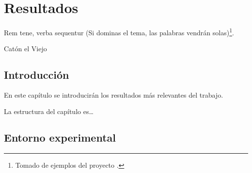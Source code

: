 %
%
%
% 
%
%
%
%

\chapter{Resultados}
\label{cha:resultados}


\begin{FraseCelebre}
  \begin{Frase}
    Rem tene, verba sequentur (Si dominas el tema, las palabras vendrán solas)\footnote{Tomado de ejemplos del proyecto \texis{}.}.
  \end{Frase}
  \begin{Fuente}
    Catón el Viejo
  \end{Fuente}
\end{FraseCelebre}

\section{Introducción}
\label{sec:introduccion-resultados}

En este capítulo se introducirán los resultados más relevantes del trabajo.

La estructura del capítulo es\ldots


\section{Entorno experimental}
\label{sec:entorno-experimental}

